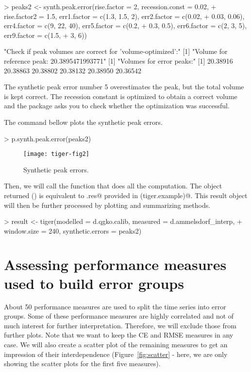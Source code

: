 \documentclass[a4paper]{article}
\begin{document}
\begin{Schunk}
\begin{Sinput}
> peaks2 <- synth.peak.error(rise.factor = 2, recession.const = 0.02, 
+     rise.factor2 = 1.5, err1.factor = c(1.3, 1.5, 2), err2.factor = c(0.02, 
+         0.03, 0.06), err4.factor = c(9, 22, 40), err5.factor = c(0.2, 
+         0.3, 0.5), err6.factor = c(2, 3, 5), err9.factor = c(1.5, 
+         3, 6))
\end{Sinput}
\begin{Soutput}
[1] "Check if peak volumes are correct for 'volume-optimized'\npeaks:"
[1] "Volume for reference peak:  20.3895471993771"
[1] "Volumes for error peaks:"
[1] 20.38916 20.38863 20.38802 20.38132 20.38950 20.36542
\end{Soutput}
\end{Schunk}

The synthetic peak error number 5 overestimates the peak, but the
total volume is kept correct. The recession constant is optimized to
obtain a correct volume and the package asks you to check whether the
optimization was successful.

The command bellow plots the synthetic peak errors.

\begin{Schunk}
\begin{Sinput}
> p.synth.peak.error(peaks2)
\end{Sinput}
\end{Schunk}

\begin{figure}
\begin{center}
\texttt{[image: tiger-fig2]}
\end{center}
\caption{Synthetic peak errors.}
\label{fig:peaks}
\end{figure}

Then, we will call the function that does all the computation. The
object returned (\verb@result@) is equivalent to \verb@tiger.res@
provided in \verb@data(tiger.example)@. This result object will then
be further processed by plotting and summarizing methods.
\begin{Schunk}
\begin{Sinput}
> result <- tiger(modelled = d.qgko.calib, measured = d.ammelsdorf_interp, 
+     window.size = 240, synthetic.errors = peaks2)
\end{Sinput}
\end{Schunk}

\section{Assessing performance measures used to build error groups}
About 50 performance measures are used to split the time series into
error groups. Some of these performance measures are highly correlated
and not of much interest for further interpretation. Therefore, we
will exclude those from further plots. Note that we want to keep the
CE and RMSE measures in any case. We will also create a scatter
plot of the remaining measures to get an impression of their
interdependence (Figure~\ref{fig:scatter} - here, we are only showing
the scatter plots for the first five measures).
\end{document}
